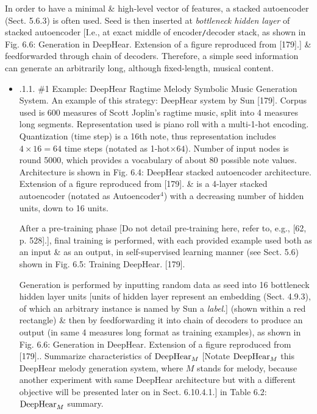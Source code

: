 \documentclass{article}
\begin{document}
\begin{itemize}
\begin{itemize}
\begin{itemize}
			In order to have a minimal \& high-level vector of features, a stacked autoencoder (Sect. 5.6.3) is often used. Seed is then inserted at {\it bottleneck hidden layer} of stacked autoencoder [I.e., at exact middle of encoder{\tt/}decoder stack, as shown in {\sf Fig. 6.6: Generation in DeepHear. Extension of a figure reproduced from [179].}] \& feedforwarded through chain of decoders. Therefore, a simple seed information can generate an arbitrarily long, although fixed-length, musical content.
			\begin{itemize}
				\item {.1.1. \#1 Example: DeepHear Ragtime Melody Symbolic Music Generation System.} An example of this strategy: DeepHear system by {\sc Sun} [179]. Corpus used is 600 measures of {\sc Scott Joplin}'s ragtime music, split into 4 measures long segments. Representation used is piano roll with a multi-1-hot encoding. Quantization (time step) is a 16th note, thus representation includes $4\times16 = 64$ time steps (notated as 1-hot$\times64$). Number of input nodes is round 5000, which provides a vocabulary of about 80 possible note values. Architecture is shown in {\sf Fig. 6.4: DeepHear stacked autoencoder architecture. Extension of a figure reproduced from [179].} \& is a 4-layer stacked autoencoder (notated as Autoencoder${}^4$) with a decreasing number of hidden units, down to 16 units.

				After a pre-training phase [Do not detail pre-training here, refer to, e.g., [62, p. 528].], final training is performed, with each provided example used both as an input \& as an output, in self-supervised learning manner (see Sect. 5.6) shown in {\sf Fig. 6.5: Training DeepHear. [179]}.

				Generation is performed by inputting random data as seed into 16 bottleneck hidden layer units [units of hidden layer represent an embedding (Sect. 4.9.3), of which an arbitrary instance is named by {\sc Sun} a {\it label}.] (shown within a red rectangle) \& then by feedforwarding it into chain of decoders to produce an output (in same 4 measures long format as training examples), as shown in {\sf Fig. 6.6: Generation in DeepHear. Extension of a figure reproduced from [179].}. Summarize characteristics of ${\rm DeepHear}_M$ [Notate ${\rm DeepHear}_M$ this DeepHear melody generation system, where $M$ stands for melody, because another experiment with same DeepHear architecture but with a different objective will be presented later on in Sect. 6.10.4.1.] in {\sf Table 6.2: ${\rm DeepHear}_M$ summary.}


\end{itemize}
\end{itemize}
\end{itemize}
\end{itemize}
\end{document}
